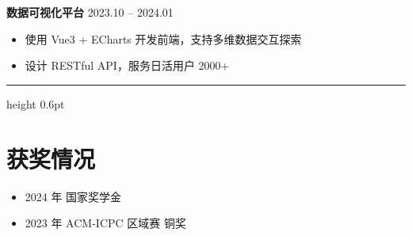 \documentclass[UTF8,a4paper,11pt]{ctexart}
\begin{document}
\vspace{0.5em}
\textbf{数据可视化平台} \hfill 2023.10 -- 2024.01 \\
\begin{itemize}
  \item 使用 Vue3 + ECharts 开发前端，支持多维数据交互探索
  \item 设计 RESTful API，服务日活用户 2000+
\end{itemize}

\vspace{0.5em}
{\color{accent}\hrule height 0.6pt}
\vspace{1em}

\section*{\textcolor{accent}{获奖情况}}
\begin{itemize}
  \item 2024 年 国家奖学金
  \item 2023 年 ACM-ICPC 区域赛 铜奖
\end{itemize}
\end{document}
